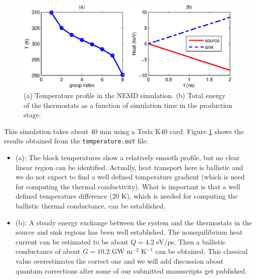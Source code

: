 \documentclass[12pt,a4paper]{report}
\begin{document}
\begin{figure}[ht]
\begin{center}
\includegraphics[width=\columnwidth]{ex4a.eps}
\caption{(a) Temperature profile in the NEMD simulation. (b) Total energy of the thermostats as a function of simulation time in the production stage. }
\label{figure:ex4a}
\end{center}
\end{figure}

This simulation takes about 40 min using a Tesla K40 card. Figure \ref{figure:ex4a} shows the results obtained from the \verb"temperature.out" file:
\begin{itemize}
\item (a): The block temperatures show a relatively smooth profile, but no clear linear region can be identified. Actually, heat transport here is ballistic and we do not expect to find a well defined temperature gradient (which is need for computing the thermal conductivity). What is important is that a well defined temperature difference (20 K), which is needed for computing the ballistic thermal conductance, can be established.
\item (b): A steady energy exchange between the system and the thermostats in the source and sink regions has been well established. The nonequilibrium heat current can be estimated to be about $Q=4.2$ eV/ps. Then a ballistic conductance of about $G=10.2$ GW m$^{-2}$ K$^{-1}$ can be obtained. This classical value overestimates the correct one and we will add discussion about quantum corrections after some of our submitted manuscripts get published.
\end{itemize}
\end{document}
